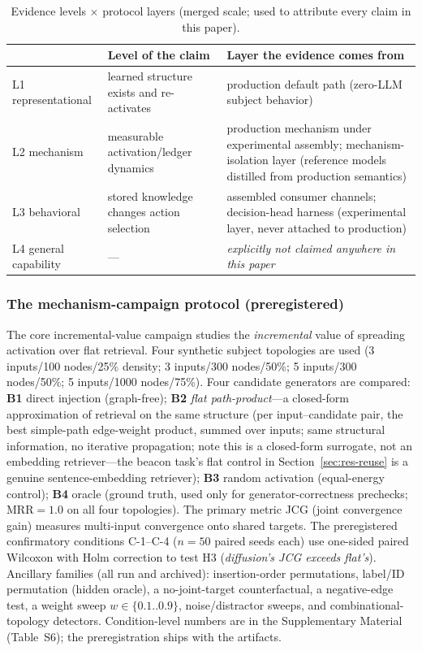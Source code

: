 \documentclass[10pt]{article}
\begin{document}
\begin{table}[t]
\centering\small
\caption{Evidence levels $\times$ protocol layers (merged scale; used to attribute every claim in this paper).}
\label{tab:evidence}
\begin{tabular}{L{3.2cm}L{4.4cm}L{6.4cm}}
\toprule
 & \textbf{Level of the claim} & \textbf{Layer the evidence comes from} \\
\midrule
L1 representational & learned structure exists and re-activates & production default path (zero-LLM subject behavior) \\
L2 mechanism & measurable activation/ledger dynamics & production mechanism under experimental assembly; mechanism-isolation layer (reference models distilled from production semantics) \\
L3 behavioral & stored knowledge changes action selection & assembled consumer channels; decision-head harness (experimental layer, never attached to production) \\
L4 general capability & --- & \emph{explicitly not claimed anywhere in this paper} \\
\bottomrule
\end{tabular}
\end{table}

\subsubsection{The mechanism-campaign protocol (preregistered)}
\label{sec:method-civ}
The core incremental-value campaign studies the \emph{incremental} value of spreading activation over flat retrieval. Four synthetic subject topologies are used (3 inputs/100 nodes/25\% density; 3 inputs/300 nodes/50\%; 5 inputs/300 nodes/50\%; 5 inputs/1000 nodes/75\%). Four candidate generators are compared: \textbf{B1} direct injection (graph-free); \textbf{B2} \emph{flat path-product}---a closed-form approximation of retrieval on the same structure (per input--candidate pair, the best simple-path edge-weight product, summed over inputs; same structural information, no iterative propagation; note this is a closed-form surrogate, not an embedding retriever---the beacon task's flat control in Section~\ref{sec:res-reuse} is a genuine sentence-embedding retriever); \textbf{B3} random activation (equal-energy control); \textbf{B4} oracle (ground truth, used only for generator-correctness prechecks; MRR${=}1.0$ on all four topologies). The primary metric JCG (joint convergence gain) measures multi-input convergence onto shared targets. The preregistered confirmatory conditions C-1--C-4 ($n{=}50$ paired seeds each) use one-sided paired Wilcoxon with Holm correction to test H3 (\emph{diffusion's JCG exceeds flat's}). Ancillary families (all run and archived): insertion-order permutations, label/ID permutation (hidden oracle), a no-joint-target counterfactual, a negative-edge test, a weight sweep $w\in\{0.1..0.9\}$, noise/distractor sweeps, and combinational-topology detectors. Condition-level numbers are in the Supplementary Material (Table~S6); the preregistration ships with the artifacts.
\end{document}
